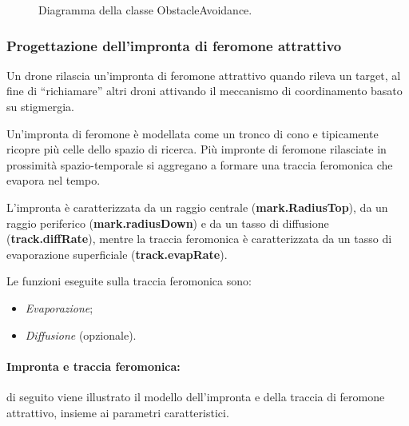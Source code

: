 \begin{figure}[H] 
    \captionsetup{justification=centering, margin=2cm, font=footnotesize}
    \begin{center}
    \end{center}
    \caption[short]{Diagramma della classe ObstacleAvoidance.}
    \label{classe_overlapping}
\end{figure}

\subsubsection{Progettazione dell'impronta di feromone attrattivo}

Un drone rilascia un’impronta di feromone attrattivo quando rileva un target, al fine di “richiamare” altri droni attivando il meccanismo di coordinamento basato su stigmergia. 

Un’impronta di feromone è modellata come un tronco di cono e tipicamente ricopre più celle dello spazio di ricerca. 
Più impronte di feromone rilasciate in prossimità spazio-temporale si aggregano a formare una traccia feromonica che evapora nel tempo. 

L’impronta è caratterizzata da un raggio centrale (\textbf{mark.RadiusTop}), da un raggio periferico (\textbf{mark.radiusDown}) e da un tasso di diffusione (\textbf{track.diffRate}), mentre la traccia feromonica è caratterizzata da un tasso di evaporazione superficiale (\textbf{track.evapRate}). 

Le funzioni eseguite sulla traccia feromonica sono:
\begin{itemize}
	\item \textit{Evaporazione};
	\item \textit{Diffusione} (opzionale).
\end{itemize}

\paragraph{Impronta e traccia feromonica:} di seguito viene illustrato il modello dell'impronta e della traccia di feromone attrattivo, insieme ai parametri caratteristici.

